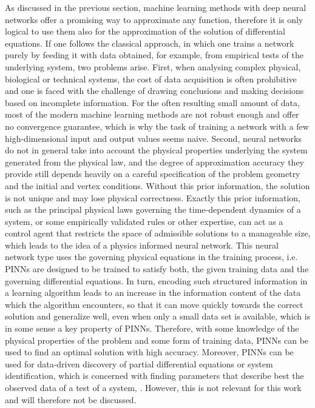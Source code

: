 As discussed in the previous section, machine learning methods with deep neural networks offer a promising way to approximate any function, therefore it is only logical to use them also for the approximation of the solution of differential equations. If one follows the classical approach, in which one trains a network purely by feeding it with data obtained, for example, from empirical tests of the underlying system, two problems arise. First, when analysing complex physical, biological or technical systems, the cost of data acquisition is often prohibitive and one is faced with the challenge of drawing conclusions and making decisions based on incomplete information. For the often resulting small amount of data, most of the modern machine learning methods are not robust enough and offer no convergence guarantee, which is why the task of training a network with a few high-dimensional input and output values seems naive. Second, neural networks do not in general take into account the physical properties underlying the system generated from the physical law, and the degree of approximation accuracy they provide still depends heavily on a careful specification of the problem geometry and the initial and vertex conditions. Without this prior information, the solution is not unique and may lose physical correctness. Exactly this prior information, such as the principal physical laws governing the time-dependent dynamics of a system, or some empirically validated rules or other expertise, can act as a control agent that restricts the space of admissible solutions to a manageable size, which leads to the idea of a physics informed neural network. This neural network type uses the governing physical equations in the training process, i.e. PINNs are designed to be trained to satisfy both, the given training data and the governing differential equations. In turn, encoding such structured information in a learning algorithm leads to an increase in the information content of the data which the algorithm encounters, so that it can move quickly towards the correct solution and generalize well, even when only a small data set is available, which is in some sense a key property of PINNs. Therefore, with some knowledge of the physical properties of the problem and some form of training data, PINNs can be used to find an optimal solution with high accuracy. Moreover, PINNs can be used for data-driven discovery of partial differential equations or system identification, which is concerned with finding parameters that describe best the observed data of a test of a system, \cite[pp.~1-2]{RaissiPerdikarisKarniadakisPart1:2017}. However, this is not relevant for this work and will therefore not be discussed. \\
